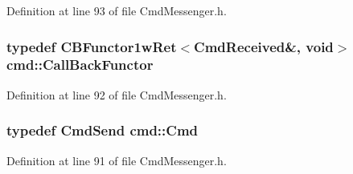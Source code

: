 Definition at line 93 of file Cmd\+Messenger.\+h.

\hypertarget{namespacecmd_a24926dd0c7587e1961fd9ebe0259beea}{
\subsubsection[{Call\+Back\+Functor}]{\setlength{\rightskip}{0pt plus 5cm}typedef C\+B\+Functor1w\+Ret$<${\bf Cmd\+Received}\&, void$>$ {\bf cmd\+::\+Call\+Back\+Functor}}}\label{namespacecmd_a24926dd0c7587e1961fd9ebe0259beea}


Definition at line 92 of file Cmd\+Messenger.\+h.

\hypertarget{namespacecmd_af9b58ca395c80edd1335e21d1b9f4c99}{
\subsubsection[{Cmd}]{\setlength{\rightskip}{0pt plus 5cm}typedef {\bf Cmd\+Send} {\bf cmd\+::\+Cmd}}}\label{namespacecmd_af9b58ca395c80edd1335e21d1b9f4c99}


Definition at line 91 of file Cmd\+Messenger.\+h.

